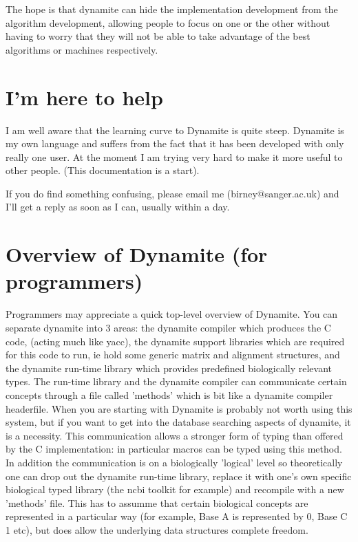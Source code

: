 The hope is that dynamite can hide the implementation development
from the algorithm development, allowing people to focus on one or the
other without having to worry that they will not be able to take advantage
of the best algorithms or machines respectively.

\section{I'm here to help}

I am well aware that the learning curve to Dynamite is quite steep. Dynamite is
my own language and suffers from the fact that it has been developed with only
really one user. At the moment I am trying very hard to make it more useful
to other people. (This documentation is a start).

If you do find something confusing, please email me (birney@sanger.ac.uk) and
I'll get a reply as soon as I can, usually within a day.

\section{Overview of Dynamite (for programmers)}
Programmers may appreciate a quick top-level overview of Dynamite. You
can separate dynamite into 3 areas: the dynamite compiler which
produces the C code, (acting much like yacc), the dynamite support
libraries which are required for this code to run, ie hold some
generic matrix and alignment structures, and the dynamite run-time
library which provides predefined biologically relevant types. The
run-time library and the dynamite compiler can communicate certain
concepts through a file called 'methods' which is bit like a dynamite
compiler headerfile. When you are starting with Dynamite is probably
not worth using this system, but if you want to get into the database
searching aspects of dynamite, it is a necessity.  This communication
allows a stronger form of typing than offered by the C implementation:
in particular macros can be typed using this method. In addition the
communication is on a biologically 'logical' level so theoretically
one can drop out the dynamite run-time library, replace it with one's
own specific biological typed library (the ncbi toolkit for example)
and recompile with a new 'methods' file. This has to assumme that
certain biological concepts are represented in a particular way (for
example, Base A is represented by 0, Base C 1 etc), but does allow the
underlying data structures complete freedom.

